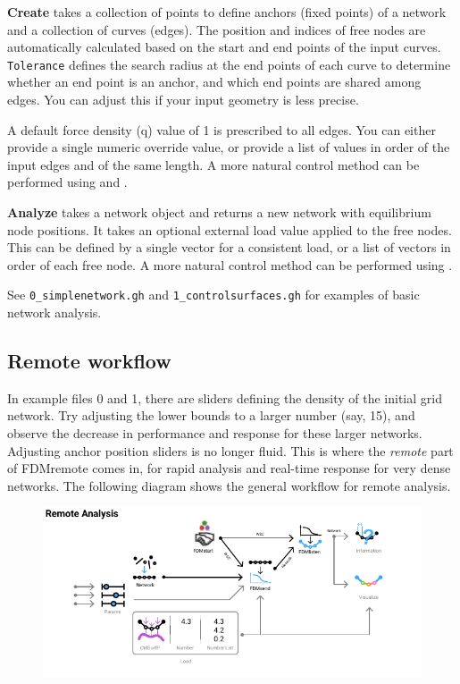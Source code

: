 \textbf{Create} takes a collection of points to define anchors (fixed points) of a network and a collection of curves (edges). The position and indices of free nodes are automatically calculated based on the start and end points of the input curves. \texttt{Tolerance} defines the search radius at the end points of each curve to determine whether an end point is an anchor, and which end points are shared among edges. You can adjust this if your input geometry is less precise.

A default force density (q) value of 1 is prescribed to all edges. You can either provide a single numeric override value, or provide a list of values in order of the input edges and of the same length. A more natural control method can be performed using  and .


\textbf{Analyze} takes a network object and returns a new network with equilibrium node positions. It takes an optional external load value applied to the free nodes. This can be defined by a single vector for a consistent load, or a list of vectors in order of each free node. A more natural control method can be performed using .

\vspace{2em}

See \texttt{0\_simplenetwork.gh} and \texttt{1\_controlsurfaces.gh} for examples of basic network analysis.

\newpage
\subsection{Remote workflow}
In example files 0 and 1, there are sliders defining the density of the initial grid network. Try adjusting the lower bounds to a larger number (say, 15), and observe the decrease in performance and response for these larger networks. Adjusting anchor position sliders is no longer fluid. This is where the \textit{remote} part of FDMremote comes in, for rapid analysis and real-time response for very dense networks. The following diagram shows the general workflow for remote analysis.

\begin{figure}[h]
    \centering
    \includegraphics*[width = \textwidth]{Figures/remote}
\end{figure}

